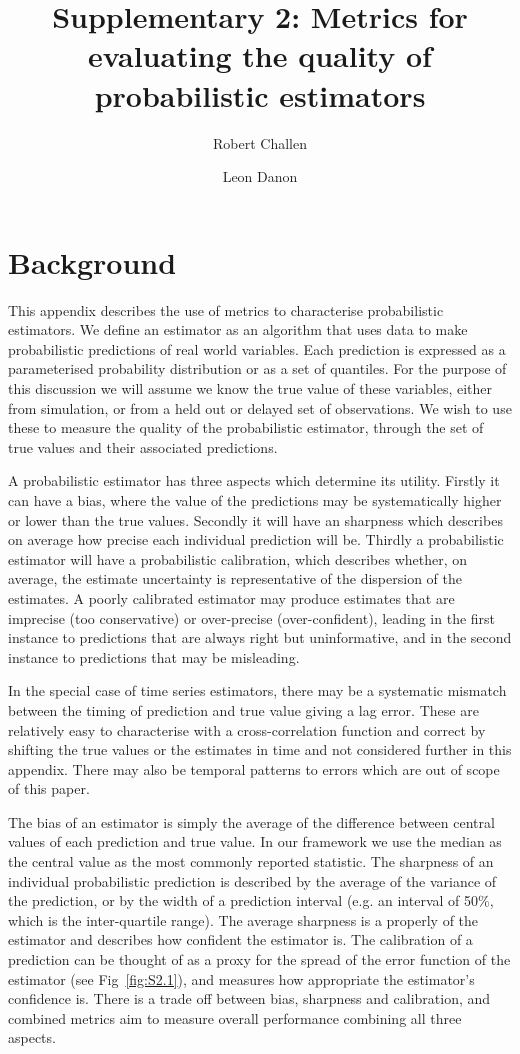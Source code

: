 \documentclass[a4paper, 12pt, twoside]{article}
\title{Supplementary 2: Metrics for evaluating the quality of probabilistic estimators}
\author[1,2]{Robert Challen}
\author[1,2]{Leon Danon}
\affil[1]{AI4CI, University of Bristol, Bristol, UK.}
\affil[2]{Department of Engineering Mathematics, University of Bristol, Bristol, UK.}
\date{}                     %
\let\Oldsection\section
\renewcommand{\section}{\FloatBarrier\Oldsection}
\begin{document}
\maketitle

\section{Background}

This appendix describes the use of metrics to characterise probabilistic estimators. We define an estimator as an algorithm that uses data to make probabilistic predictions of real world variables. Each prediction is expressed as a parameterised probability distribution or as a set of quantiles. For the purpose of this discussion we will assume we know the true value of these variables, either from simulation, or from a held out or delayed set of observations. We wish to use these to measure the quality of the probabilistic estimator, through the set of true values and their associated predictions.

A probabilistic estimator has three aspects which determine its utility. Firstly it can have a bias, where the value of the predictions may be systematically higher or lower than the true values. Secondly it will have an sharpness which describes on average how precise each individual prediction will be. Thirdly a probabilistic estimator will have a probabilistic calibration, which describes whether, on average, the estimate uncertainty is representative of the dispersion of the estimates. A poorly calibrated estimator may produce estimates that are imprecise (too conservative) or over-precise (over-confident), leading in the first instance to predictions that are always right but uninformative, and in the second instance to predictions that may be misleading.

In the special case of time series estimators, there may be a systematic mismatch between the timing of prediction and true value giving a lag error. These are relatively easy to characterise with a cross-correlation function and correct by shifting the true values or the estimates in time and not considered further in this appendix. There may also be temporal patterns to errors which are out of scope of this paper.

The bias of an estimator is simply the average of the difference between central values of each prediction and true value. In our framework we use the median as the central value as the most commonly reported statistic. The sharpness of an individual probabilistic prediction is described by the average of the variance of the prediction, or by the width of a prediction interval (e.g. an interval of 50\%, which is the inter-quartile range). The average sharpness is a properly of the estimator and describes how confident the estimator is. The calibration of a prediction can be thought of as a proxy for the spread of the error function of the estimator (see Fig~\ref{fig:S2.1}), and measures how appropriate the estimator's confidence is. There is a trade off between bias, sharpness and calibration, and combined metrics aim to measure overall performance combining all three aspects.
\end{document}
